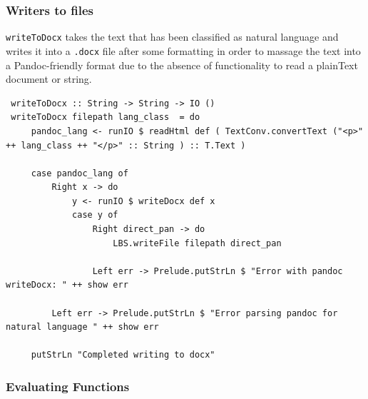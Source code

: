 \documentclass[12pt]{scrreprt}
\begin{document}
\subsubsection{Writers to files}
\texttt{writeToDocx} takes the text that has been classified as natural language and writes it into a \texttt{.docx} file after some formatting in order to massage the text into a Pandoc-friendly format due to the absence of functionality to read a plainText document or string.

\begin{verbatim}
 writeToDocx :: String -> String -> IO ()
 writeToDocx filepath lang_class  = do
     pandoc_lang <- runIO $ readHtml def ( TextConv.convertText ("<p>" ++ lang_class ++ "</p>" :: String ) :: T.Text )
 
     case pandoc_lang of
         Right x -> do
             y <- runIO $ writeDocx def x
             case y of
                 Right direct_pan -> do
                     LBS.writeFile filepath direct_pan
 
                 Left err -> Prelude.putStrLn $ "Error with pandoc writeDocx: " ++ show err
 
         Left err -> Prelude.putStrLn $ "Error parsing pandoc for natural language " ++ show err
 
     putStrLn "Completed writing to docx"
\end{verbatim}


\subsubsection{Evaluating Functions}
\end{document}
